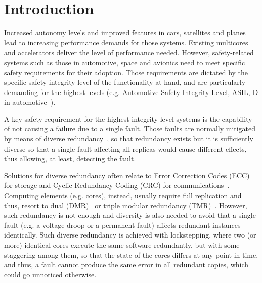 \section{Introduction}

Increased autonomy levels and improved features in cars, satellites and planes lead to increasing performance demands for those systems. Existing multicores and accelerators deliver the level of performance needed. However, safety-related systems such as those in automotive, space and avionics need to meet specific safety requirements for their adoption. Those requirements are dictated by the specific safety integrity level of the functionality at hand, and are particularly demanding for the highest levels (e.g. Automotive Safety Integrity Level, ASIL, D in automotive~\cite{ISO26262}). 

A key safety requirement for the highest integrity level systems is the capability of not causing a failure due to a single fault. Those faults are normally mitigated by means of diverse redundancy~\cite{ClassicDiversity}, so that redundancy exists but it is sufficiently diverse so that a single fault affecting all replicas would cause different effects, thus allowing, at least, detecting the fault. 

Solutions for diverse redundancy often relate to Error Correction Codes (ECC) for storage and Cyclic Redundancy Coding (CRC) for communications~\cite{SergiIOLTS}. Computing elements (e.g. cores), instead, usually require full replication and thus, resort to dual (DMR)~\cite{Mukherjee2002,Gomaa2003,dynamic_coupled_cores} or triple modular redundancy (TMR)~\cite{Iturbe2019}. However, such redundancy is not enough and diversity is also needed to avoid that a single fault (e.g. a voltage droop or a permanent fault) affects redundant instances identically. Such diverse redundancy is achieved with lockstepping, where two (or more) identical cores execute the same software redundantly, but with some staggering among them, so that the state of the cores differs at any point in time, and thus, a fault cannot produce the same error in all redundant copies, which could go unnoticed otherwise.

